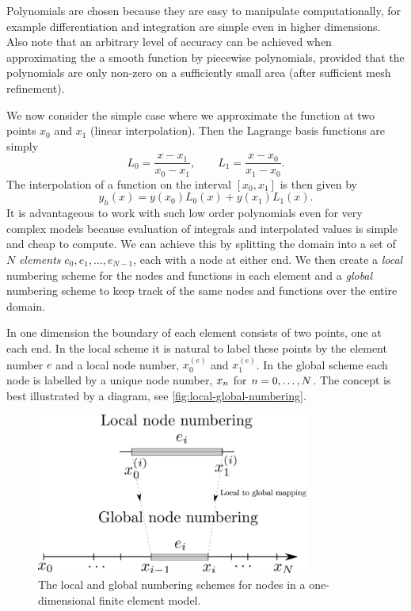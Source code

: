 Polynomials are chosen because they are easy to manipulate computationally, for example differentiation and integration are simple even in higher dimensions.
Also note that an arbitrary level of accuracy can be achieved when approximating the a smooth function by piecewise polynomials, provided that the polynomials are only non-zero on a sufficiently small area (\ie after sufficient mesh refinement).

We now consider the simple case where we approximate the function at two points $x_{0}$ and $x_{1}$ (linear interpolation).
Then the Lagrange basis functions are simply
\begin{equation}
  L_{0}=\dfrac{x-x_{1}}{x_{0}-x_{1}},\qquad
  L_{1}=\dfrac{x-x_{0}}{x_{1}-x_{0}}.
  \label{eq:simple_lagrange}
\end{equation}
The interpolation of a function on the interval $[x_{0},x_{1}]$ is then given by
\begin{equation}
  y_{h}(x)=y(x_{0})L_{0}(x)+y(x_{1})L_{1}(x).
\end{equation}
It is advantageous to work with such low order polynomials even for very complex models because evaluation of integrals and interpolated values is simple and cheap to compute.
We can achieve this by splitting the domain into a set of $N$ \emph{elements} $e_{0},e_{1},\ldots,e_{N-1}$, each with a node at either end. %
We then create a \emph{local} numbering scheme for the nodes and functions in each element and a \emph{global} numbering scheme to keep track of the same nodes and functions over the entire domain.

In one dimension the boundary of each element consists of two points, one at each end.
In the local scheme it is natural to label these points by the element number $e$ and a local node number, \ie $x_{0}^{(e)}$ and $x_{1}^{(e)}$.
In the global scheme each node is labelled by a unique node number, \ie $x_{n}$ for $n=0,\ldots,N$.
The concept is best illustrated by a diagram, see \autoref{fig:local-global-numbering}.

\begin{figure}
  \center
  \includegraphics[width=0.8\textwidth]{./images/local_global_numbering}
  \caption{The local and global numbering schemes for nodes in a one-dimensional
    finite element model.}
  \label{fig:local-global-numbering}
\end{figure}

